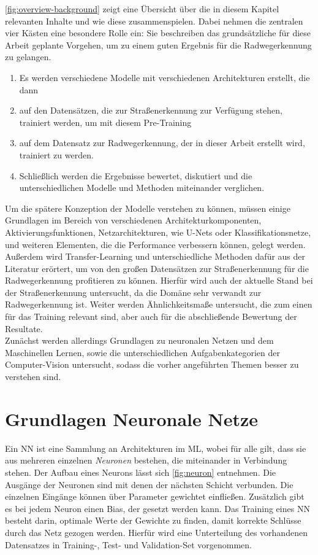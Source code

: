 \autoref{fig:overview-background} zeigt eine Übersicht über die in diesem Kapitel relevanten Inhalte und wie diese 
zusammenspielen. Dabei nehmen die zentralen vier Kästen eine besondere Rolle ein: Sie beschreiben das grundsätzliche 
für diese Arbeit geplante Vorgehen, um zu einem guten Ergebnis für die Radwegerkennung zu gelangen. 
\begin{enumerate}
	\item Es werden verschiedene Modelle mit verschiedenen Architekturen erstellt, die dann
	\item auf den Datensätzen, die zur Straßenerkennung zur Verfügung stehen, trainiert werden, um mit diesem Pre-Training
	\item auf dem Datensatz zur Radwegerkennung, der in dieser Arbeit erstellt wird, trainiert zu werden.
	\item Schließlich werden die Ergebnisse bewertet, diskutiert und die unterschiedlichen Modelle und Methoden miteinander verglichen.  
\end{enumerate}
Um die spätere Konzeption der Modelle verstehen zu können, müssen einige Grundlagen im Bereich von verschiedenen 
Architekturkomponenten, Aktivierungsfunktionen, Netzarchitekturen, wie U-Nets oder Klassifikationsnetze, und 
weiteren Elementen, die die Performance verbessern können, gelegt werden. 
Außerdem wird Transfer-Learning und unterschiedliche Methoden dafür aus der Literatur erörtert, um von den 
großen Datensätzen zur Straßenerkennung für die Radwegerkennung profitieren zu können. 
Hierfür wird auch der aktuelle Stand bei der Straßenerkennung untersucht, da die Domäne sehr verwandt zur Radwegerkennung ist.
Weiter werden Ähnlichkeitsmaße untersucht, die zum einen für das Training relevant sind, aber auch für die 
abschließende Bewertung der Resultate.  \\
Zunächst werden allerdings Grundlagen zu neuronalen Netzen und dem Maschinellen Lernen, 
sowie die unterschiedlichen Aufgabenkategorien der Computer-Vision untersucht, sodass die vorher angeführten Themen 
besser zu verstehen sind.  

\section{Grundlagen Neuronale Netze}

Ein \ac{NN} ist eine Sammlung an Architekturen im \ac{ML}, wobei für alle gilt,
dass sie aus mehreren einzelnen \textit{Neuronen} bestehen, die miteinander in Verbindung stehen.
Der Aufbau eines Neurons lässt sich \autoref{fig:neuron} entnehmen.
Die Ausgänge der Neuronen sind mit denen der nächsten Schicht verbunden.
Die einzelnen Eingänge können über Parameter gewichtet einfließen.
Zusätzlich gibt es bei jedem Neuron einen Bias, der gesetzt werden kann.
Das Training eines \ac{NN} besteht darin, optimale Werte der Gewichte zu finden, damit korrekte Schlüsse durch das Netz gezogen werden.
Hierfür wird eine Unterteilung des vorhandenen Datensatzes in Training-, Test- und Validation-Set vorgenommen.

